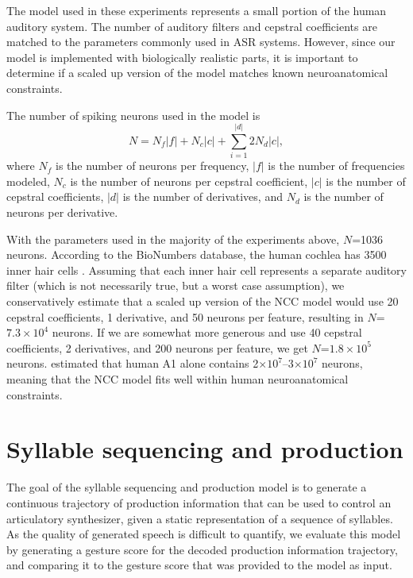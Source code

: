 The model used in these experiments
represents a small portion
of the human auditory system.
The number of auditory filters
and cepstral coefficients
are matched to the parameters
commonly used in ASR systems.
However, since our model is
implemented with biologically realistic parts,
it is important to determine
if a scaled up version of the model
matches known neuroanatomical constraints.

The number of spiking neurons used
in the model is
\begin{equation}
  N = N_f |f| + N_c |c| + \sum_{i=1}^{|d|} 2 N_d |c|,
\end{equation}
where $N_f$ is the number of neurons per frequency,
$|f|$ is the number of frequencies modeled,
$N_c$ is the number of neurons per cepstral coefficient,
$|c|$ is the number of cepstral coefficients,
$|d|$ is the number of derivatives,
and $N_d$ is the number of neurons per derivative.

With the parameters used
in the majority of the experiments above,
$N$=1036 neurons.
According to the BioNumbers database,
the human cochlea has 3500 inner hair cells
\citep[BNID~100697]{milo2010}.
Assuming that each inner hair cell
represents a separate auditory filter
(which is not necessarily true,
but a worst case assumption),
we conservatively estimate
that a scaled up version
of the NCC model
would use 20 cepstral coefficients,
1 derivative, and 50 neurons per feature,
resulting in $N$=$7.3 \times 10^4$ neurons.
If we are somewhat more generous
and use 40 cepstral coefficients,
2 derivatives, and 200 neurons per feature,
we get $N$=$1.8 \times 10^5$ neurons.
\citet{smiley2013} estimated
that human A1 alone contains
2$\times 10^7$--3$\times 10^7$ neurons,
meaning that the NCC model
fits well within human neuroanatomical constraints.

\section{Syllable sequencing and production}
\label{sec:results-production}

The goal of the syllable sequencing and production model
is to generate a continuous trajectory
of production information
that can be used to control
an articulatory synthesizer,
given a static representation
of a sequence of syllables.
As the quality of generated speech
is difficult to quantify,
we evaluate this model
by generating a gesture score
for the decoded production information trajectory,
and comparing it
to the gesture score that was provided
to the model as input.

